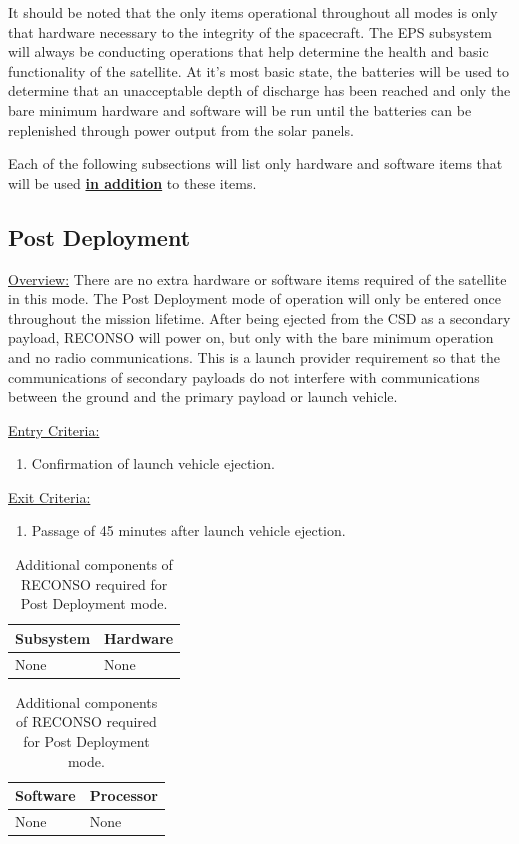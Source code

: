 \documentclass{article}
\begin{document}
It should be noted that the only items operational throughout all modes is only that hardware necessary to the integrity of the spacecraft. The EPS subsystem will always be conducting operations that help determine the health and basic functionality of the satellite. At it's most basic state, the batteries will be used to determine that an unacceptable depth of discharge has been reached and only the bare minimum hardware and software will be run until the batteries can be replenished through power output from the solar panels.

Each of the following subsections will list only hardware and software items that will be used \underline{\textbf{in addition}} to these items.

\newpage

\subsection{Post Deployment}

\underline{Overview:} There are no extra hardware or software items required of the satellite in this mode. The Post Deployment mode of operation will only be entered once throughout the mission lifetime. After being ejected from the CSD as a secondary payload, RECONSO will power on, but only with the bare minimum operation and no radio communications. This is a launch provider requirement so that the communications of secondary payloads do not interfere with communications between the ground and the primary payload or launch vehicle.

\underline{Entry Criteria:} 

\begin{enumerate}
\item Confirmation of launch vehicle ejection.
\end{enumerate}

\underline{Exit Criteria:} 

\begin{enumerate}
\item Passage of 45 minutes after launch vehicle ejection.
\end{enumerate}

\begin{table}[h!]
\caption{Additional components of RECONSO required for Post Deployment mode.}
\begin{adjustbox}{center}
\begin{tabular}{|l|l|}
\hline
Subsystem & Hardware \\ \hline \hline
None & None  \\ \hline
\end{tabular}

\quad

\begin{tabular}{|l|l|}
\hline
Software & Processor \\ \hline \hline
None & None \\ \hline
\end{tabular}
\end{adjustbox}
\end{table}
\end{document}
